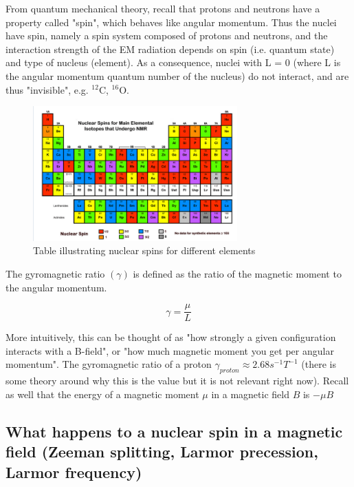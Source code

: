 \documentclass[12pt]{article}
\begin{document}
From quantum mechanical theory, recall that protons and neutrons have a property called "spin", which behaves like angular momentum. Thus the nuclei have spin, namely a spin system composed of protons and neutrons, and the interaction strength of the EM radiation depends on spin (i.e. quantum state) and type of nucleus (element). As a consequence, nuclei with L = 0 (where L is the angular momentum quantum number of the nucleus) do not interact, and are thus "invisible", e.g. $^{12}\text{C}$, $^{16}\text{O}$. %

\begin{figure}[h!]
  \centering
  \includegraphics[width=0.7\textwidth]{element_spin.png}
  \caption{Table illustrating nuclear spins for different elements \cite{mri_questions_nuclear_spin}}
  \label{fig:example}
\end{figure}

The gyromagnetic ratio $(\gamma)$ is defined as the ratio of the magnetic moment to the angular momentum.

\[\gamma = \frac{\mu}{L}\]

More intuitively, this can be thought of as "how strongly a given configuration interacts with a B-field", or "how much magnetic moment you get per angular momentum". The gyromagnetic ratio of a proton $\gamma_{proton} \approx 2.68 s^{-1}T^{-1}$ (there is some theory around why this is the value but it is not relevant right now). Recall as well that the energy of a magnetic moment $\mu$ in a magnetic field $B$ is $-\mu B$

\subsection{What happens to a nuclear spin in a magnetic field (Zeeman splitting, Larmor precession, Larmor frequency)}
\end{document}
